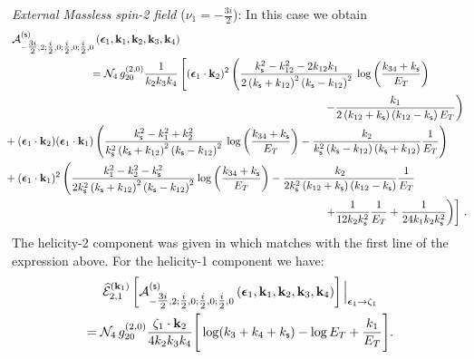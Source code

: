 \documentclass[11pt,a4paper]{article}
\begin{document}
\noindent \emph{External Massless spin-2 field} ($\nu_1=-\frac{3i}{2}$): In this case we obtain
\begin{align}\label{graviton4pt}
  &  {\cal A}^{\left({\sf s}\right)}_{-\tfrac{3i}{2},2;\tfrac{i}{2},0;\tfrac{i}{2},0;\tfrac{i}{2},0}\left(\boldsymbol{\epsilon}_1, {\bf k}_1, {\bf k}_2,{\bf k}_3, {\bf k}_4\right)\\&\hspace*{2.5cm}={\cal N}_4\,g_{20}^{(2,0)}\frac{1}{k_2 k_3 k_4}\left[(\boldsymbol{\epsilon}_1\cdot\bold{k}_2)^2\left(\frac{k^2_{\mathsf{s}}-k_{12}^2-2k_{12}k_1}{2\left(k_{\sf s}+k_{12}\right)^2\left(k_{\sf s}-k_{12}\right)^2}\,\log \left(\frac{k_{34}+k_{\mathsf{s}}}{E_T}\right)\right.\right. \nonumber \\&\hspace*{10cm} \left.\left.-\frac{k_1}{2\left(k_{12}+k_{\mathsf{s}}\right)\left(k_{12}-k_{\mathsf{s}}\right) E_T}\right)\right.\nonumber\\
    &\hspace*{-0.25cm}+(\boldsymbol{\epsilon}_1\cdot\bold{k}_2)(\boldsymbol{\epsilon}_1\cdot\bold{k}_1)\left(\frac{k^2_{\mathsf{s}}-k^2_1+k^2_2}{k_{\mathsf{s}}^2\left(k_{\sf s}+k_{12}\right)^2\left(k_{\sf s}-k_{12}\right)^2}\,\log \left(\frac{k_{34}+k_{\sf s}}{E_T}\right)-\frac{k_2}{k_{\mathsf{s}}^2 \left(k_{\sf s}-k_{12}\right)\left(k_{\sf s}+k_{12}\right)}\frac{1}{E_T}\right)\nonumber\\\nonumber
    &\hspace*{-0.25cm}+(\boldsymbol{\epsilon}_1\cdot\bold{k}_1)^2\left(\frac{k^2_1-k^2_2-k^2_{\mathsf{s}}}{2k_{\mathsf{s}}^2\left(k_{\sf s}+k_{12}\right)^2\left(k_{\sf s}-k_{12}\right)^2}\log \left(\frac{k_{34}+k_{\sf s}}{E_T}\right)-\frac{k_2}{2k_{\mathsf{s}}^2\left(k_{12}+k_{\sf s}\right)\left(k_{12}-k_{\sf s}\right)}\frac{1}{E_T}\right.\\
    &\hspace{10cm}\left.\left.+\frac{1}{12 k_2k_{\mathsf{s}}^2}\frac{1}{E_T}+\frac{1}{24k_1 k_2k_{\mathsf{s}}^2}\right)\right]\,.\nonumber
\end{align}
The helicity-2 component was given in \cite{Baumann:2020dch} which matches with the first line of the expression above. For the helicity-1 component we have:
\begin{multline}
      \widehat{\mathcal{E}}_{2,1}^{(\bold{k}_1)}\left[ {\cal A}^{\left({\sf s}\right)}_{-\tfrac{3i}{2},2;\tfrac{i}{2},0;\tfrac{i}{2},0;\tfrac{i}{2},0}\left(\boldsymbol{\epsilon}_1, {\bf k}_1, {\bf k}_2,{\bf k}_3, {\bf k}_4\right)\right]\Big|_{\boldsymbol{\epsilon}_1 \to \zeta_1}
      \\ ={\cal N}_4\,g_{20}^{(2,0)}\frac{\zeta_1\cdot\bold{k}_2}{4k_2 k_3 k_4}\Bigg[\log (k_3+k_4+k_{\mathsf{s}})-\log E_T+\frac{k_1}{E_T}\Bigg].
\end{multline}
\end{document}
